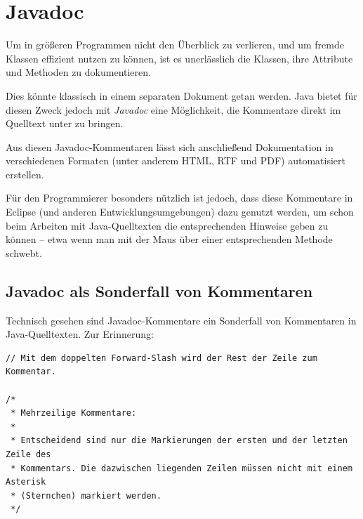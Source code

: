 \chapter{Javadoc}
\renewcommand{\chaptertitle}{Javadoc}

\lehead[]{\sf\hspace*{-2.00cm}\textcolor{white}{\colorbox{lightblue}{\makebox[1.60cm][r]{\thechapter}}}\hspace{0.17cm}\textcolor{lightblue}{\chaptertitle}}
\rohead[]{\textcolor{lightblue}{\chaptertitle}\sf\hspace*{0.17cm}\textcolor{white}{\colorbox{lightblue}{\makebox[1.60cm][l]{\thechapter}}}\hspace{-2.00cm}}
\rehead[]{\textcolor{lightblue}{AvHG, Inf, My}}
\lohead[]{\textcolor{lightblue}{AvHG, Inf, My}}

\lstset{style=myJava}

Um in größeren Programmen nicht den Überblick zu verlieren, und um fremde
Klassen effizient nutzen zu können, ist es unerlässlich die Klassen, ihre
Attribute und Methoden zu dokumentieren.

Dies könnte klassisch in einem separaten Dokument getan werden. Java bietet für
diesen Zweck jedoch mit {\em Javadoc} eine Möglichkeit, die Kommentare direkt im
Quelltext unter zu bringen.

Aus diesen Javadoc-Kommentaren lässt sich anschließend Dokumentation in
verschiedenen Formaten (unter anderem HTML, RTF und PDF) automatisiert
erstellen.

Für den Programmierer besonders nützlich ist jedoch, dass diese Kommentare in
Eclipse (und anderen Entwicklungsumgebungen) dazu genutzt werden, um schon beim
Arbeiten mit Java-Quelltexten die entsprechenden Hinweise geben zu können --
etwa wenn man mit der Maus über einer entsprechenden Methode schwebt.


\section{Javadoc als Sonderfall von Kommentaren}

Technisch gesehen sind Javadoc-Kommentare ein Sonderfall von Kommentaren in
Java-Quelltexten. Zur Erinnerung:

\begin{lstlisting}
// Mit dem doppelten Forward-Slash wird der Rest der Zeile zum Kommentar.

/* 
 * Mehrzeilige Kommentare:
 *
 * Entscheidend sind nur die Markierungen der ersten und der letzten Zeile des
 * Kommentars. Die dazwischen liegenden Zeilen müssen nicht mit einem Asterisk
 * (Sternchen) markiert werden.
 */
\end{lstlisting}

